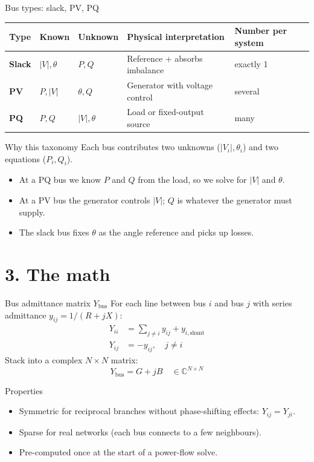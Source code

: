 \documentclass[aspectratio=169,10pt]{beamer}
\begin{document}
\begin{frame}{Bus types: slack, PV, PQ}
\centering
\small
\begin{tabular}{lllll}
\toprule
Type & Known & Unknown & Physical interpretation & Number per system \\
\midrule
\textbf{Slack} & $|V|, \theta$ & $P, Q$ & Reference + absorbs imbalance & exactly 1 \\
\textbf{PV} & $P, |V|$ & $\theta, Q$ & Generator with voltage control & several \\
\textbf{PQ} & $P, Q$ & $|V|, \theta$ & Load or fixed-output source & many \\
\bottomrule
\end{tabular}
\vspace{0.8em}
\begin{block}{Why this taxonomy}
Each bus contributes two unknowns ($|V_i|, \theta_i$) and two equations ($P_i, Q_i$).
\begin{itemize}
  \item At a PQ bus we know $P$ and $Q$ from the load, so we solve for $|V|$ and $\theta$.
  \item At a PV bus the generator controls $|V|$; $Q$ is whatever the generator must supply.
  \item The slack bus fixes $\theta$ as the angle reference and picks up losses.
\end{itemize}
\end{block}
\end{frame}

\section*{3. The math}

\begin{frame}{Bus admittance matrix $Y_{\text{bus}}$}
For each line between bus $i$ and bus $j$ with series admittance $y_{ij} = 1/(R + jX)$:
\begin{align*}
Y_{ii} &= \sum_{j \neq i} y_{ij} + y_{i,\text{shunt}} \\
Y_{ij} &= -y_{ij}, \quad j \neq i
\end{align*}
\vspace{0.4em}
Stack into a complex $N \times N$ matrix:
\begin{equation*}
Y_{\text{bus}} = G + jB \quad \in \mathbb{C}^{N \times N}
\end{equation*}
\begin{block}{Properties}
\begin{itemize}
  \item Symmetric for reciprocal branches without phase-shifting effects: $Y_{ij}=Y_{ji}$.
  \item Sparse for real networks (each bus connects to a few neighbours).
  \item Pre-computed once at the start of a power-flow solve.
\end{itemize}
\end{block}
\end{frame}
\end{document}
